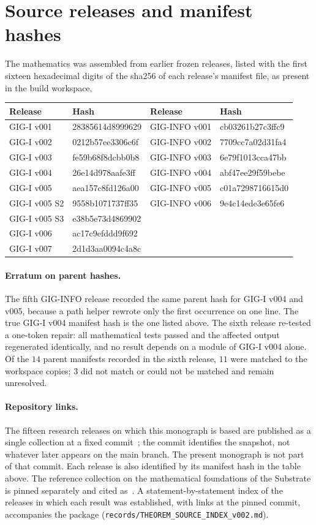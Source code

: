 \section{Source releases and manifest hashes}
The mathematics was assembled from earlier frozen releases, listed with the first sixteen hexadecimal digits of the sha256 of each release's manifest file, as present in the build workspace.
\begin{center}\footnotesize\setlength{\tabcolsep}{5pt}
\begin{tabular}{@{}llll@{}}\toprule Release & Hash & Release & Hash\\\midrule
GIG-I v001 & 28385614d8999629 & GIG-INFO v001 & cb03261b27c3ffc9\\
GIG-I v002 & 0212b57ee3306c6f & GIG-INFO v002 & 7709cc7a02d31fa4\\
GIG-I v003 & fe59b68f8dcbb0b8 & GIG-INFO v003 & 6e79f1013cca47bb\\
GIG-I v004 & 26e14d978aafe3ff & GIG-INFO v004 & abf47ee29f59bebe\\
GIG-I v005 & aea157c8fd126a00 & GIG-INFO v005 & c01a7298716615d0\\
GIG-I v005 S2 & 9558b1071737ff35 & GIG-INFO v006 & 9e4c14ede3e65fe6\\
GIG-I v005 S3 & e38b5e73d4869902 & & \\
GIG-I v006 & ac17c9efddd9f692 & & \\
GIG-I v007 & 2d1d3aa0094c4a8c & & \\
\bottomrule\end{tabular}\end{center}
\paragraph{Erratum on parent hashes.} The fifth GIG-INFO release recorded the same parent hash for GIG-I v004 and v005, because a path helper rewrote only the first occurrence on one line. The true GIG-I v004 manifest hash is the one listed above. The sixth release re-tested a one-token repair: all mathematical tests passed and the affected output regenerated identically, and no result depends on a module of GIG-I v004 alone. Of the $14$ parent manifests recorded in the sixth release, $11$ were matched to the workspace copies; $3$ did not match or could not be matched and remain unresolved.
\paragraph{Repository links.} The fifteen research releases on which this monograph is based are published as a single collection at a fixed commit~\cite{UNNSGIG}; the commit identifies the snapshot, not whatever later appears on the main branch. The present monograph is not part of that commit. Each release is also identified by its manifest hash in the table above. The reference collection on the mathematical foundations of the Substrate is pinned separately and cited as~\cite{UNNSFound}. A statement-by-statement index of the releases in which each result was established, with links at the pinned commit, accompanies the package (\texttt{records/THEOREM\_SOURCE\_INDEX\_v002.md}).


